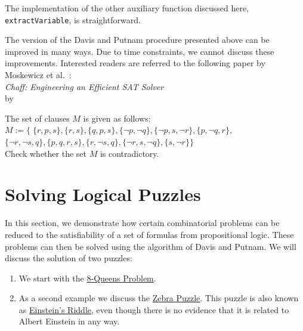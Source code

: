 The implementation of the other auxiliary function discussed here, \texttt{extractVariable}, is
straightforward.

The version of the Davis and Putnam procedure presented above can be improved in many ways.
Due to time constraints, we cannot discuss these improvements. Interested readers are
referred to the following paper by Moskewicz et al.~\cite{moskewicz:2001}: 
\\[0.2cm]
\hspace*{1.3cm} \textsl{Chaff: Engineering an Efficient SAT Solver} \\
\hspace*{1.3cm} by  

\exerciseEng
The set of clauses $M$ is given as follows: \\[0.2cm]
\hspace*{1.3cm} $M := \bigl\{ \; \{ r, p, s \},
                         \{r, s \}, \{ q, p, s \},
                         \{ \neg p,  \neg q\},
                         \{ \neg p, s,  \neg r\},
                         \{p,  \neg q, r \},$ \\[0.2cm]
\hspace*{2.6cm} $\{ \neg r,  \neg s, q\},
                         \{p, q, r, s \},
                         \{r,  \neg s, q\},
                         \{ \neg r,  s, \neg q\},
                         \{s, \neg r\} \bigr\}$ \\[0.2cm]
Check whether the set $M$ is contradictory.  \eox

\section{Solving Logical Puzzles}
In this section, we demonstrate how certain combinatorial problems can be reduced to the satisfiability of a
set of formulas from propositional logic.  These problems can then be solved using the algorithm of
Davis and Putnam.  We will discuss the solution of two puzzles:
\begin{enumerate}
\item We start with the
      \href{https://en.wikipedia.org/wiki/Eight_queens_puzzle}{8-Queens Problem}. 
\item As a second example we discuss the
      \href{https://en.wikipedia.org/wiki/Zebra_puzzle}{Zebra Puzzle}.  This puzzle is also known as
      \href{https://www.brainzilla.com/logic/zebra/einsteins-riddle/}{Einstein's Riddle},
      even though there is no evidence that it is related to Albert Einstein in any way.
\end{enumerate}

